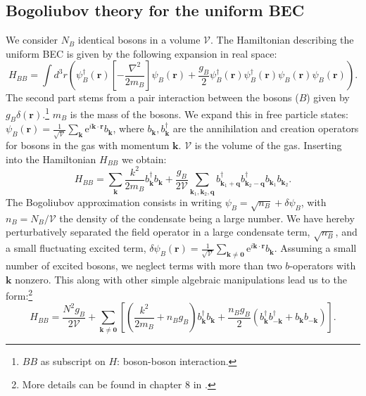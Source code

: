 \subsection{Bogoliubov theory for the uniform BEC}
\label{sec.BEC}
We consider $N_B$ identical bosons in a volume $\mathcal{V}$. The Hamiltonian describing the uniform BEC is given by the following expansion in real space: 
\begin{equation}
H_{BB} = \int d^3 r \left(\psi_B^\dagger(\mathbf{r})\left[-\frac{\nabla^2}{2m_B}\right]\psi_B(\mathbf{r}) + \frac{g_B}{2}\psi_B^\dagger(\mathbf{r})\psi_B^\dagger(\mathbf{r})\psi_B(\mathbf{r})\psi_B(\mathbf{r})  \right). 
\label{eq.BECHamiltonianrealspace}
\end{equation}
The second part stems from a pair interaction between the bosons ($B$) given by $g_B\delta(\mathbf{r})$.\footnote{$BB$ as subscript on $H$: boson-boson interaction.} $m_B$ is the mass of the bosons. We expand this in free particle states: $\psi_B(\mathbf{r}) = \frac{1}{\sqrt{\mathcal{V}}}\sum_\mathbf{k} \text{e}^{i\mathbf{k}\cdot\mathbf{r}}b_\mathbf{k}$, where $b_\mathbf{k}, b^\dagger_\mathbf{k}$ are the annihilation and creation operators for bosons in the gas with momentum $\mathbf{k}$. $\mathcal{V}$ is the volume of the gas. Inserting into the Hamiltonian $H_{BB}$ we obtain: 
\begin{equation}
H_{BB} = \sum_\mathbf{k} \frac{k^2}{2m_B}b_\mathbf{k}^\dagger b_\mathbf{k} + \frac{g_B}{2\mathcal{V}}\sum_{\mathbf{k}_1,\mathbf{k}_2,\mathbf{q}} b^\dagger_{\mathbf{k}_1+\mathbf{q}}b^\dagger_{\mathbf{k}_2-\mathbf{q}}b_{\mathbf{k}_1}b_{\mathbf{k}_2}. 
\label{eq.BECHamiltonianmomentumspace} 
\end{equation}
The Bogoliubov approximation consists in writing $\psi_B = \sqrt{n_B} + \delta \psi_B$, with $n_B = N_B/\mathcal{V}$ the density of the condensate being a large number. We have hereby perturbatively separated the field operator in a large condensate term, $\sqrt{n_B}$, and a small fluctuating excited term, $\delta \psi_B(\mathbf{r}) =  \frac{1}{\sqrt{\mathcal{V}}}\sum_{\mathbf{k}\neq \mathbf{0}} \text{e}^{i\mathbf{k}\cdot\mathbf{r}}b_\mathbf{k}$. Assuming a small number of excited bosons, we neglect terms with more than two $b$-operators with $\mathbf{k}$ nonzero. This along with other simple algebraic manipulations lead us to the form:\footnote{More details can be found in chapter 8 in \cite{Pethick}.} 
\begin{equation}
H_{BB} = \frac{N^2g_B}{2\mathcal{V}} + \sum_{\mathbf{k}\neq \mathbf{0}}\left[\left(\frac{k^2}{2m_B}+n_Bg_B\right)b_\mathbf{k}^\dagger b_\mathbf{k} + \frac{n_Bg_B}{2}\left( b_\mathbf{k}^\dagger b_{-\mathbf{k}}^\dagger + b_{\mathbf{k}} b_{-\mathbf{k}} \right) \right].
\label{eq.bosonHamiltonian}
\end{equation}
